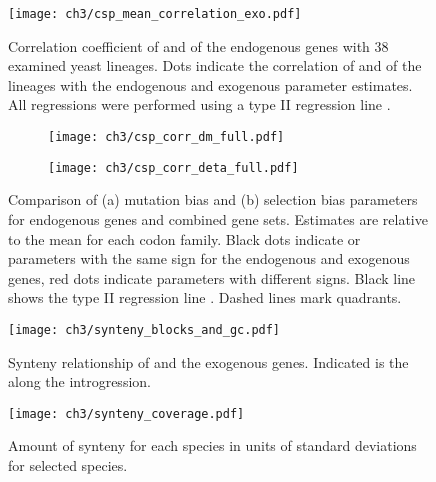 \null
\vfill
\begin{figure}[H]
     \centering
	\texttt{[image: ch3/csp\_mean\_correlation\_exo.pdf]}
	\caption{Correlation coefficient of \DM and \DE of the endogenous genes with 38 examined yeast lineages. 
	Dots indicate the correlation of \DM and \DE of the lineages with the endogenous and exogenous parameter estimates. 
	All regressions were performed using a type II regression line \citep{SokalAndRohlf1981}.}
	\label{fig:csp_endo_comp}
\end{figure}
\null
\vfill
\clearpage
\null
\vfill

\begin{figure}[h]
    \centering
    \begin{subfigure}
        \centering
        \texttt{[image: ch3/csp\_corr\_dm\_full.pdf]}
    \end{subfigure}
    \begin{subfigure}
        \centering
        \texttt{[image: ch3/csp\_corr\_deta\_full.pdf]}
    \end{subfigure}
    \caption{Comparison of (a) mutation bias \DM and (b) selection bias \DE parameters for endogenous genes and combined gene sets.
      Estimates are relative to the mean for each codon family.
      Black dots indicate \DM or \DE parameters with the same sign for the endogenous and exogenous genes, red dots indicate parameters with different signs.
      Black line shows the type II regression line \citep{SokalAndRohlf1981}.
      Dashed lines mark quadrants.}
    \label{fig:csp_end_comb}
\end{figure}
\null
\vfill
\clearpage


\null
\vfill
\begin{figure}[H]
     \centering
	\texttt{[image: ch3/synteny\_blocks\_and\_gc.pdf]}
	\caption{Synteny relationship of \gossypii and the exogenous genes. Indicated is the \GC along the introgression.}
	\label{fig:synt_rel}
\end{figure}
\null
\vfill
\clearpage
\null
\vfill
\begin{figure}[H]
     \centering
	\texttt{[image: ch3/synteny\_coverage.pdf]}
	\caption{Amount of synteny for each species in units of standard deviations for selected species.}
	\label{fig:synteny_species}
\end{figure}
\null
\vfill
\clearpage
\null
\vfill

